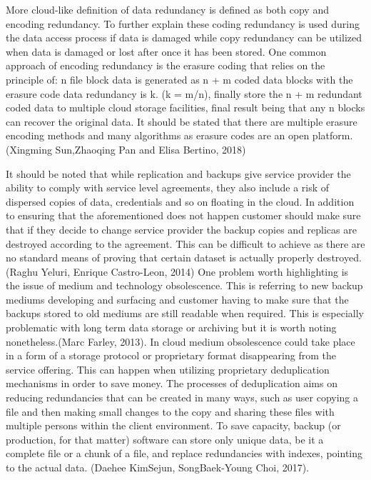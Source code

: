 \documentclass{article}
\begin{document}
\par
More cloud-like definition of data redundancy is defined as both copy and encoding redundancy. To further explain these coding redundancy is used during the data access process if data is damaged while copy redundancy can be utilized when data is damaged or lost after once it has been stored. One common approach of encoding redundancy is the erasure coding that relies on the principle of: n file block data is generated as n + m coded data blocks with the erasure code data redundancy is k. (k = m/n), finally store the n + m redundant coded data to multiple cloud storage facilities, final result being that any n blocks can recover the original data. It should be stated that there are multiple erasure encoding methods and many algorithms as erasure codes are an open platform. (Xingming Sun,Zhaoqing Pan and Elisa Bertino, 2018)
\par
It should be noted that while replication and backups give service provider the ability to comply with service level agreements, they also include a risk of dispersed copies of data, credentials and so on floating in the cloud. In addition to ensuring that the aforementioned does not happen customer should make sure that if they decide to change service provider the backup copies and replicas are destroyed according to the agreement. This can be difficult to achieve as there are no standard means of proving that certain dataset is actually properly destroyed.(Raghu Yeluri, Enrique Castro-Leon, 2014)
One problem worth highlighting is the issue of medium and technology obsolescence. This is referring to new backup mediums developing and surfacing and customer having to make sure that the backups stored to old mediums are still readable when required. This is especially problematic with long term data storage or archiving but it is worth noting nonetheless.(Marc Farley, 2013). In cloud medium obsolescence could take place in a form of a storage protocol or proprietary format disappearing from the service offering.
This can happen when utilizing proprietary deduplication mechanisms in order to save money. The processes of deduplication aims on reducing redundancies that can be created in many ways, such as user copying a file and then making small changes to the copy and sharing these files with multiple persons within the client environment. To save capacity, backup (or production, for that matter) software can store only unique data, be it a complete file or a chunk of a file,  and replace redundancies with indexes, pointing to the actual data. (Daehee KimSejun, SongBaek-Young Choi, 2017).
\end{document}
